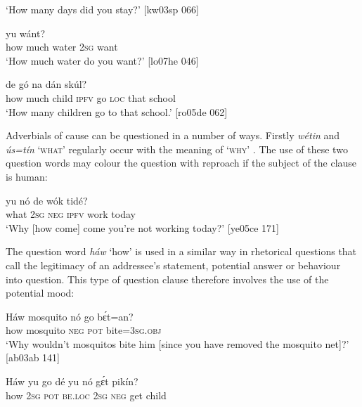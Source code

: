 \glt ‘How many days did you stay?’ [kw03sp 066]
\z


\ea%
    \label{ex:key:637}
    \gll {}     yu  wánt?\\
how    much  water  \textsc{2sg}  want\\

\glt ‘How much water do you want?’ [lo07he 046]
\z


\ea%
    \label{ex:key:638}
    \gll {}      de  gó  na  dán  skúl?\\
how    much  child  \textsc{ipfv}  go  \textsc{loc}  that  school\\
\glt ‘How many children go to that school.’ [ro05de 062]
\z

Adverbials of cause can be questioned in a number of ways. Firstly \textit{wétin} and \textit{ús=tín} ‘\textsc{what’} regularly occur with the meaning of ‘\textsc{why}’ . The use of these two question words may colour the question with reproach if the subject of the clause is human:


\ea%
    \label{ex:key:639}
    \gll {}  yu  nó  de  wók    tidé?\\
what  \textsc{2sg}  \textsc{neg}  \textsc{ipfv}  work  today\\

\glt ‘Why [how come] come you’re not working today?’ [ye05ce 171]
\z

The question word \textit{háw} ‘how’ is used in a similar way in rhetorical questions that call the legitimacy of an addressee’s statement, potential answer or behaviour into question. This type of question clause therefore involves the use of the potential mood: 


\ea%
    \label{ex:key:640}
    \gll Háw  mosquito  nó  go  bɛ́t=an?\\
how    mosquito  \textsc{neg}  \textsc{pot}  bite=\textsc{3sg.obj}\\

\glt ‘Why wouldn’t mosquitos bite him [since you have 
removed the mosquito net]?’ [ab03ab 141]
\z


\ea%
    \label{ex:key:641}
    \gll Háw  yu  go  dé    yu  nó  gɛ́t  pikín?\\
how    \textsc{2sg}  \textsc{pot}  \textsc{be.loc}  \textsc{2sg}  \textsc{neg}  get  child\\


